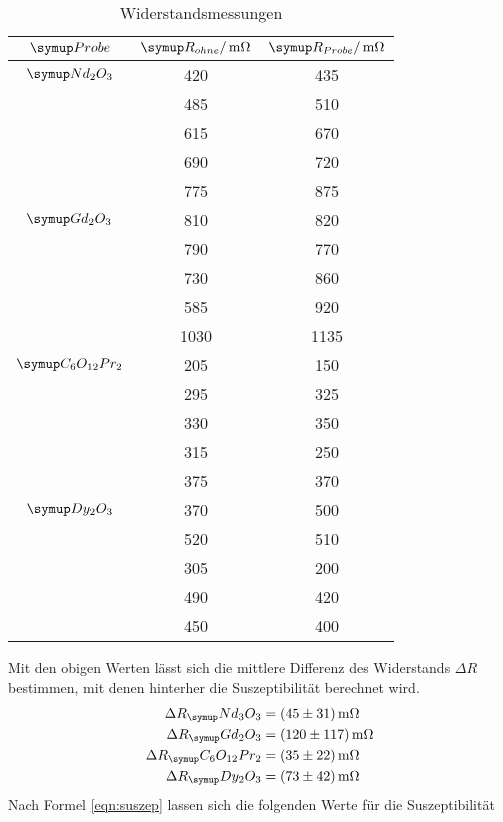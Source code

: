 \begin{table}
  \centering
  \begin{tabular}{c c c}
    \toprule
    $\su{Probe}$ & $\su{R_{ohne}/\mOhm}$ &$\su{R_{Probe}}/\mOhm$ \\
    \midrule
    $\su{Nd_2O_3}$   & 420 & 435 \\
                     & 485 & 510 \\
                     & 615 & 670 \\
                     & 690 & 720 \\
                     & 775 & 875 \\ \hline
    $\su{Gd_2O_3}$   & 810 & 820 \\
                     & 790 & 770 \\
                     & 730 & 860 \\
                     & 585 & 920 \\
                     &1030 &1135 \\ \hline
    $\su{C_6O_{12}Pr_2}$  & 205 & 150 \\
                          & 295 & 325 \\
                          & 330 & 350 \\
                          & 315 & 250 \\
                          & 375 & 370 \\ \hline
    $\su{Dy_2O_3}$   & 370 & 500 \\
                     & 520 & 510 \\
                     & 305 & 200 \\
                     & 490 & 420 \\
                     & 450 & 400 \\
    \bottomrule
  \end{tabular}
  \caption{Widerstandsmessungen}
  \label{tab:mess2}
\end{table}
Mit den obigen Werten lässt sich die mittlere Differenz des Widerstands
$\Delta R$ bestimmen, mit denen hinterher die Suszeptibilität berechnet wird.
\begin{align*}
  \Delta R_\su{Nd_3O_3}    &= ( 45 \pm  31) \mOhm \\
  \Delta R_\su{Gd_2O_3}    &= (120 \pm 117) \mOhm \\
  \Delta R_\su{C_6O_{12}Pr_2} &= ( 35 \pm  22) \mOhm \\
  \Delta R_\su{Dy_2O_3}    &= ( 73 \pm  42) \mOhm
\end{align*}
Nach Formel \eqref{eqn:suszep} lassen sich die folgenden Werte für die Suszeptibilität
